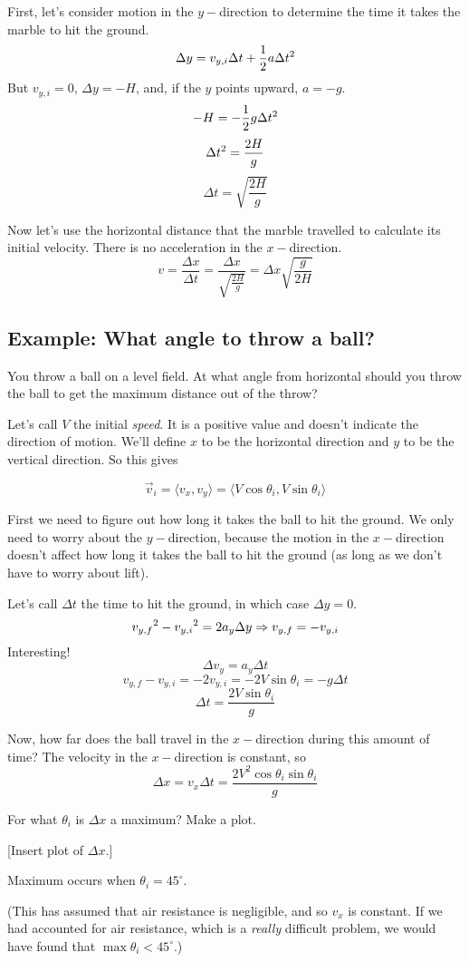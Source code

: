 First, let's consider motion in the $y-$direction to determine the time it takes the marble to hit the ground.
$$\Delta{y}=v_{y,i}\Delta{t}+\frac{1}{2}a\Delta{t}\displaystyle^2$$
But $v_{y,i}=0$, $\Delta{y}=-H$, and, if the $y$ points upward, $a=-g$.
$$-H=-\frac{1}{2}g\Delta{t}\displaystyle^2$$
$$\Delta{t}\displaystyle^2=\frac{2H}{g}$$
$$\Delta{t}=\sqrt{\frac{2H}{g}}$$

Now let's use the horizontal distance that the marble travelled to calculate its initial velocity. There is no acceleration in the $x-$direction.
$$v=\frac{\Delta{x}}{\Delta{t}}=\frac{\Delta{x}}{\sqrt{\frac{2H}{g}}}=\Delta{x}\sqrt{\frac{g}{2H}}$$

\subsection{Example: What angle to throw a ball?}
You throw a ball on a level field. At what angle from horizontal should you throw the ball to get the maximum distance out of the throw?

Let's call $V$ the initial \textit{speed}. It is a positive value and doesn't indicate the direction of motion. We'll define $x$ to be the horizontal direction and $y$ to be the vertical direction. So this gives

$$\vec{v}_i=\langle{v_x,v_y}\rangle=\langle{V\cos\theta_i,V\sin\theta_i}\rangle$$

First we need to figure out how long it takes the ball to hit the ground. We only need to worry about the $y-$direction, because the motion in the $x-$direction doesn't affect how long it takes the ball to hit the ground (as long as we don't have to worry about lift).

Let's call $\Delta{t}$ the time to hit the ground, in which case $\Delta{y}=0$.
$$v_{y,f}\displaystyle^2-v_{y,i}\displaystyle^2=2a_y\Delta{y}\Rightarrow v_{y,f}=-v_{y,i}$$
Interesting!
$$\Delta{v_y}=a_y\Delta{t}$$
$$v_{y,f}-v_{y,i}=-2v_{y,i}=-2V\sin\theta_i=-g\Delta{t}$$
$$\Delta{t}=\frac{2V\sin\theta_i}{g}$$

Now, how far does the ball travel in the $x-$direction during this amount of time? The velocity in the $x-$direction is constant, so
$$\Delta{x}=v_x\Delta{t}=\frac{2V^2\cos\theta_i\sin\theta_i}{g}$$

For what $\theta_i$ is $\Delta{x}$ a maximum? Make a plot.

[Insert plot of $\Delta{x}$.]
\vspace{4cm}


Maximum occurs when $\theta_i=45^\circ$.

(This has assumed that air resistance is negligible, and so $v_x$ is constant. If we had accounted for air resistance, which is a \textit{really} difficult problem, we would have found that $\max{\theta_i}<45^\circ$.)

\clearpage

